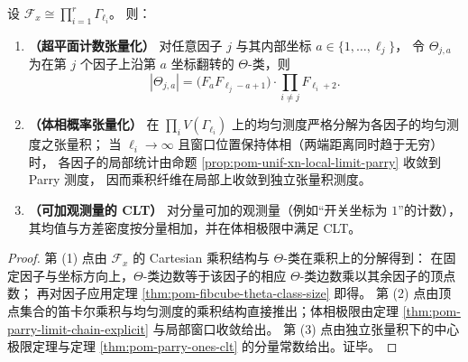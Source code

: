 \begin{proposition}\label{prop:pom-fiber-hyperplane-tensorization}
设 \(\mathcal F_x\cong\prod_{i=1}^r\Gamma_{\ell_i}\)。
则：
\begin{enumerate}
  \item \textbf{（超平面计数张量化）}
  对任意因子 \(j\) 与其内部坐标 \(a\in\{1,\dots,\ell_j\}\)，
  令 \(\Theta_{j,a}\) 为在第 \(j\) 个因子上沿第 \(a\) 坐标翻转的 \(\Theta\)-类，则
  \[
  |\Theta_{j,a}|
  =\bigl(F_aF_{\ell_j-a+1}\bigr)\cdot\prod_{i\neq j}F_{\ell_i+2}.
  \]
  \item \textbf{（体相概率张量化）}
  在 \(\prod_i V(\Gamma_{\ell_i})\) 上的均匀测度严格分解为各因子的均匀测度之张量积；
  当 \(\ell_i\to\infty\) 且窗口位置保持体相（两端距离同时趋于无穷）时，
  各因子的局部统计由命题 \ref{prop:pom-unif-xn-local-limit-parry} 收敛到 Parry 测度，
  因而乘积纤维在局部上收敛到独立张量积测度。
  \item \textbf{（可加观测量的 CLT）}
  对分量可加的观测量（例如“开关坐标为 \(1\)”的计数），其均值与方差密度按分量相加，并在体相极限中满足 CLT。
\end{enumerate}
\end{proposition}
\begin{proof}
第 (1) 点由 \(\mathcal F_x\) 的 Cartesian 乘积结构与 \(\Theta\)-类在乘积上的分解得到：
在固定因子与坐标方向上，\(\Theta\)-类边数等于该因子的相应 \(\Theta\)-类边数乘以其余因子的顶点数；
再对因子应用定理 \ref{thm:pom-fibcube-theta-class-size} 即得。
第 (2) 点由顶点集合的笛卡尔乘积与均匀测度的乘积结构直接推出；体相极限由定理 \ref{thm:pom-parry-limit-chain-explicit} 与局部窗口收敛给出。
第 (3) 点由独立张量积下的中心极限定理与定理 \ref{thm:pom-parry-ones-clt} 的分量常数给出。证毕。
\end{proof}

